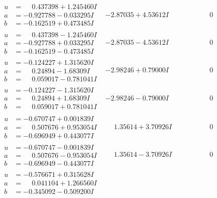 \documentclass[1p]{elsarticle_modified}
\theoremstyle{definition}
\begin{document}
$$\begin{array}{c|c|c}
 \hline 
\begin{aligned}
u &= \phantom{-}0.437398 + 1.245460 I \\
a &= -0.927788 - 0.033295 I \\
b &= -0.162519 + 0.473485 I\end{aligned}
 & -2.87035 + 4.53612 I & \phantom{-0.000000 } 0 \\ \hline\begin{aligned}
u &= \phantom{-}0.437398 - 1.245460 I \\
a &= -0.927788 + 0.033295 I \\
b &= -0.162519 - 0.473485 I\end{aligned}
 & -2.87035 - 4.53612 I & \phantom{-0.000000 } 0 \\ \hline\begin{aligned}
u &= -0.124227 + 1.315620 I \\
a &= \phantom{-}0.24894 - 1.68309 I \\
b &= \phantom{-}0.059017 - 0.781041 I\end{aligned}
 & -2.98246 + 0.79000 I & \phantom{-0.000000 } 0 \\ \hline\begin{aligned}
u &= -0.124227 - 1.315620 I \\
a &= \phantom{-}0.24894 + 1.68309 I \\
b &= \phantom{-}0.059017 + 0.781041 I\end{aligned}
 & -2.98246 - 0.79000 I & \phantom{-0.000000 } 0 \\ \hline\begin{aligned}
u &= -0.670747 + 0.001839 I \\
a &= \phantom{-}0.507676 + 0.953054 I \\
b &= -0.696949 + 0.443077 I\end{aligned}
 & \phantom{-}1.35614 + 3.70926 I & \phantom{-0.000000 } 0 \\ \hline\begin{aligned}
u &= -0.670747 - 0.001839 I \\
a &= \phantom{-}0.507676 - 0.953054 I \\
b &= -0.696949 - 0.443077 I\end{aligned}
 & \phantom{-}1.35614 - 3.70926 I & \phantom{-0.000000 } 0 \\ \hline\begin{aligned}
u &= -0.576671 + 0.315628 I \\
a &= \phantom{-}0.041104 + 1.266560 I \\
b &= -0.345092 - 0.509200 I\end{aligned}

\end{array}$$
\end{document}
